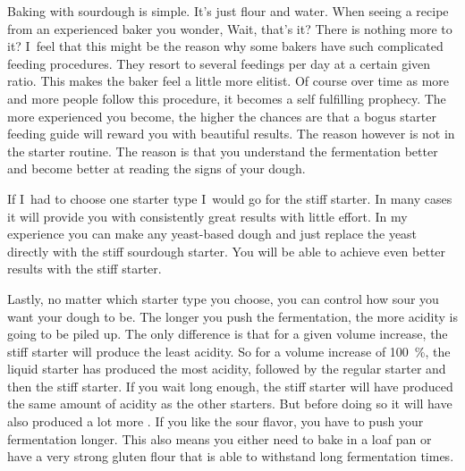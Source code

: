 Baking with sourdough is simple. It's just flour and water. When seeing a recipe
from an experienced baker you wonder, Wait, that's it? There is nothing more
to it? I~feel that this might be the reason why some bakers have such complicated
feeding procedures. They resort to several feedings per day at a certain given ratio.
This makes the baker feel a little more elitist. Of course over time as
more and more people follow this procedure, it becomes a self fulfilling prophecy.
The more experienced you become, the higher the chances are that a bogus starter
feeding guide will reward you with beautiful results. The reason however is
not in the starter routine. The reason is that you understand the fermentation better
and become better at reading the signs of your dough.

If I~had to choose one starter type I~would go for the stiff starter. In many cases
it will provide you with consistently great results with little effort.
In my experience you can make any yeast-based dough and just replace
the yeast directly with the stiff sourdough starter. You will be able
to achieve even better results with the stiff starter.

Lastly, no matter which starter type you choose, you can control how sour
you want your dough to be. The longer you push the fermentation, the more
acidity is going to be piled up. The only difference is that for a given
volume increase, the stiff starter will produce the least acidity. So for a
volume increase of \qty{100}{\percent}, the liquid starter has produced the most acidity,
followed by the regular starter and then the stiff starter. If you wait long
enough, the stiff starter will have produced the same amount of acidity as the
other starters. But before doing so it will have also produced a lot more . If
you like the sour flavor, you have to push your fermentation longer. This also
means you either need to bake in a loaf pan or have a very strong gluten flour
that is able to withstand long fermentation times.
